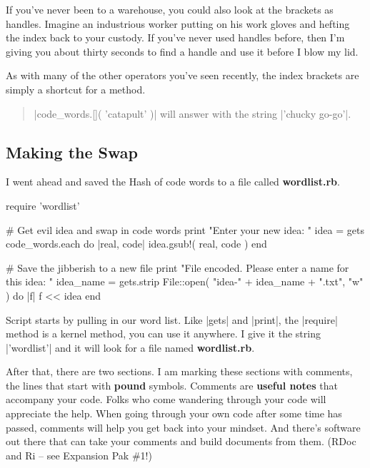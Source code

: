 \documentclass[12pt,twoside]{report}
\begin{document}
If you've never been to a warehouse, you could also look at the
brackets as handles. Imagine an industrious worker putting on his work
gloves and hefting the index back to your custody.  If you've never
used handles before, then I'm giving you about thirty seconds to find
a handle and use it before I blow my lid.

As with many of the other operators you've seen recently, the index
brackets are simply a shortcut for a method.

\begin{quote}
\rubyinline|code_words.[]( 'catapult' )| will answer
with the string \rubyinline|'chucky go-go'|.\end{quote}




\subsection{Making the Swap}



I went ahead and saved the Hash of code words to a file called {\bf
  wordlist.rb}.


\begin{rubycode}

 require 'wordlist'

 # Get evil idea and swap in code words
 print "Enter your new idea: "
 idea = gets
 code_words.each do |real, code|
   idea.gsub!( real, code )
 end

 # Save the jibberish to a new file
 print "File encoded.  Please enter a name for this idea: "
 idea_name = gets.strip
 File::open( "idea-" + idea_name + ".txt", "w" ) do |f|
   f << idea
 end

\end{rubycode}

Script starts by pulling in our word list.  Like
\rubyinline|gets| and
\rubyinline|print|, the
\rubyinline|require| method is a kernel method, you
can use it anywhere.  I give it the string
\rubyinline|'wordlist'| and it will look for a file
named {\bf wordlist.rb}.

After that, there are two sections.  I am marking these sections with
comments, the lines that start with {\bf pound} symbols.  Comments are
{\bf useful notes} that accompany your code.  Folks who come wandering
through your code will appreciate the help.  When going through your
own code after some time has passed, comments will help you get back
into your mindset.  And there's software out there that can take your
comments and build documents from them.  (RDoc and Ri -- see Expansion
Pak \#1!)
\end{document}
